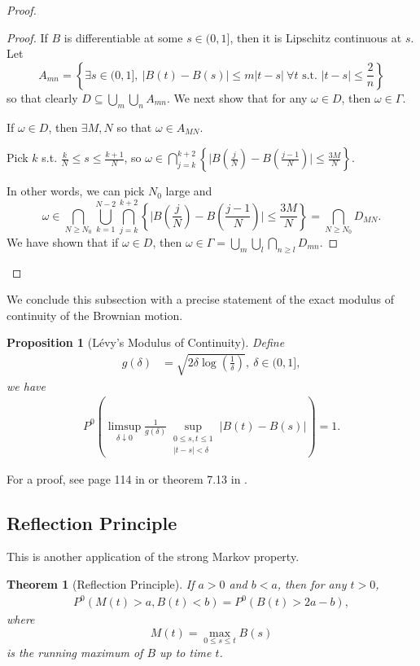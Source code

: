 \documentclass{article}
\theoremstyle{plain}
\newtheorem{theorem}{Theorem}
\newtheorem{proposition}{Proposition}
\theoremstyle{definition}
\begin{document}
\begin{proof}
\begin{proof}
If $B$ is differentiable at some $s\in(0,1]$, then it is Lipschitz continuous at $s$. Let
\[
A_{mn} = \left\{\exists s\in(0,1],\ \Big|B(t)-B(s)\Big|\le m|t-s|\ \forall t\text{ s.t. }|t-s|\le\frac{2}{n} \right\}
\]
so that clearly
$D\subseteq\bigcup_{m}\bigcup_n A_{mn}.$ We next show that for any $\omega\in D$, then $\omega\in\Gamma$.

If $\omega\in D$, then $\exists M,N$ so that $\omega\in A_{MN}$. 

Pick $k$ s.t. $\frac{k}{N}\le s\le\frac{k+1}{N}$, so $\omega\in\bigcap_{j=k}^{k+2}\left\{\Big|B(\frac{j}{N})-B(\frac{j-1}{N})\Big|\le\frac{3M}{N}\right\}$.

In other words, we can pick $N_0$ large and 
\[
\omega\in \bigcap_{N\ge N_0}\bigcup_{k=1}^{N-2}\bigcap_{j=k}^{k+2}\left\{\Big|B\left(\frac{j}{N}\right)-B\left(\frac{j-1}{N}\right)\Big|\le\frac{3M}{N}\right\} = \bigcap_{N\ge N_0}D_{MN}.
\]
We have shown that if $\omega\in D$, then $\omega \in \Gamma = \bigcup_{m}\bigcup_{l}\bigcap_{n\ge l}D_{mn}$.
\end{proof}
\end{proof}

We conclude this subsection with a precise statement of the exact modulus of continuity of the Brownian motion.

\begin{proposition}[Lévy's Modulus of Continuity] 
Define
\begin{align}
    g(\delta) &= \sqrt{2\delta\log\left(\frac{1}{\delta}\right)},\ \delta\in(0,1],
\end{align}
we have
\begin{align}
    P^0\left(\limsup_{\delta\downarrow0}\frac{1}{g(\delta)}\sup_{\substack{0\le s,t\le1\\ |t-s|<\delta}}\Big|B(t)-B(s)\Big|\right) = 1.
\end{align}
\end{proposition}

For a proof, see page 114 in \cite{karatzas2014brownian} or theorem 7.13 in \cite{ccinlar2011probability}.

\subsection{Reflection Principle}

This is another application of the strong Markov property.

\begin{theorem}[Reflection Principle]
If $a>0$ and $b<a$, then for any $t>0$,
\begin{align}
    P^0\left(M(t)>a,B(t)<b\right) = P^0\left(B(t)>2a-b\right),
\end{align}
where 
\[
M(t) = \max_{0\le s\le t}B(s)
\]
is the running maximum of $B$ up to time $t$.
\end{theorem}
\end{document}
